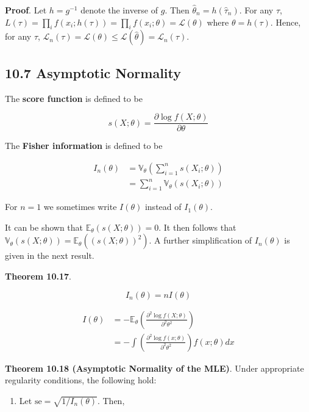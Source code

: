 \textbf{Proof}. Let \(h = g^{-1}\) denote the inverse of \(g\). Then
\(\hat{\theta}_n = h(\hat{\tau}_n)\). For any \(\tau\),
\(L(\tau) = \prod_i f(x_i; h(\tau)) = \prod_i f(x_i; \theta) = \mathcal{L}(\theta)\)
where \(\theta = h(\tau)\). Hence, for any \(\tau\),
\(\mathcal{L}_n(\tau) = \mathcal{L}(\theta) \leq \mathcal{L}(\hat{\theta}) = \mathcal{L}_n(\hat{\tau})\).

\subsection{10.7 Asymptotic Normality}\label{asymptotic-normality}

The \textbf{score function} is defined to be

\[ s(X; \theta) = \frac{\partial \log f(X; \theta)}{\partial \theta} \]

The \textbf{Fisher information} is defined to be

\begin{align}
I_n(\theta) &= \mathbb{V}_\theta \left( \sum_{i=1}^n s(X_i; \theta) \right) \\
&= \sum_{i=1}^n \mathbb{V}_\theta(s(X_i; \theta))
\end{align}

For \(n = 1\) we sometimes write \(I(\theta)\) instead of
\(I_1(\theta)\).

It can be shown that \(\mathbb{E}_\theta(s(X; \theta)) = 0\). It then
follows that
\(\mathbb{V}_\theta(s(X; \theta)) = \mathbb{E}_\theta((s(X; \theta))^2)\).
A further simplification of \(I_n(\theta)\) is given in the next result.

\textbf{Theorem 10.17}.

\[ I_n(\theta) = n I(\theta)\]

\begin{align}
I(\theta) & = -\mathbb{E}_\theta \left( \frac{\partial^2 \log f(X; \theta)}{\partial^2 \theta^2} \right) \\
&= - \int \left( \frac{\partial^2 \log f(x; \theta)}{\partial^2 \theta^2} \right) f(x; \theta) dx
\end{align}

\textbf{Theorem 10.18 (Asymptotic Normality of the MLE)}. Under
appropriate regularity conditions, the following hold:

\begin{enumerate}[tightlist,label={\arabic*.}]
\item
  Let \(\text{se} = \sqrt{1 / I_n(\theta)}\). Then,
\end{enumerate}

